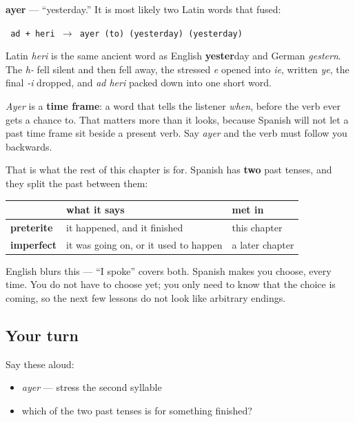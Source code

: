 \begin{cousinweb}
\textbf{ayer} — \textquotedblleft{}yesterday.\textquotedblright{} It is most likely two Latin words that fused:

\texttt{}\texttt{ ad    +   heri        $\to$   ayer (to)      (yesterday)      (yesterday) }\texttt{}

Latin \emph{heri} is the same ancient word as English \textbf{yester}day and German \emph{gestern}. The \emph{h-} fell silent and then fell away, the stressed \emph{e} opened into \emph{ie}, written \emph{ye}, the final \emph{-i} dropped, and \emph{ad heri} packed down into one short word.
\end{cousinweb}

\begin{grammarlens}[title={What you've built}]
\emph{Ayer} is a \textbf{time frame}: a word that tells the listener \emph{when}, before the verb ever gets a chance to. That matters more than it looks, because Spanish will not let a past time frame sit beside a present verb. Say \emph{ayer} and the verb must follow you backwards.

That is what the rest of this chapter is for. Spanish has \textbf{two} past tenses, and they split the past between them:

\noindent
\begin{tabularx}{\linewidth}{@{}>{\raggedright\arraybackslash}X>{\raggedright\arraybackslash}X>{\raggedright\arraybackslash}X@{}}
\toprule
\textbf{} & \textbf{what it says} & \textbf{met in} \\
\midrule
\textbf{preterite} & it happened, and it finished & this chapter \\
\textbf{imperfect} & it was going on, or it used to happen & a later chapter \\
\bottomrule
\end{tabularx}

English blurs this — \textquotedblleft{}I spoke\textquotedblright{} covers both. Spanish makes you choose, every time. You do not have to choose yet; you only need to know that the choice is coming, so the next few lessons do not look like arbitrary endings.
\end{grammarlens}

\subsection*{Your turn}
Say these aloud:

\begin{itemize}
\raggedright
  \item \emph{ayer} — stress the second syllable
  \item which of the two past tenses is for something finished?
\end{itemize}

